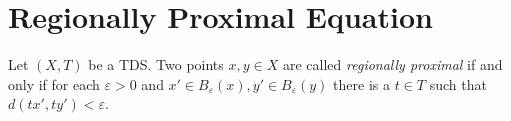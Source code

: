 \section{Regionally Proximal Equation}

\begin{definition}
  Let $(X, T)$ be a TDS.
  Two points $x,y \in X$ are called \emph{regionally proximal}
  if and only if for each $\varepsilon > 0$ and $x' \in B_\varepsilon(x), y' \in B_\varepsilon(y)$
  there is a $t \in T$ such that $d(tx', ty') < \varepsilon$.
\end{definition}